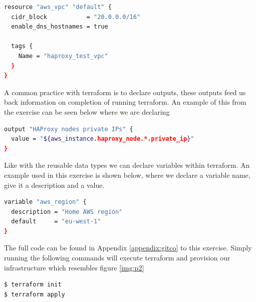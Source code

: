 \begin{lstlisting}[language=bash]
resource "aws_vpc" "default" {
  cidr_block           = "20.0.0.0/16"
  enable_dns_hostnames = true

  tags {
    Name = "haproxy_test_vpc"
  }
}
\end{lstlisting}

A common practice with terraform is to declare outputs, these outputs feed us back information on completion of running terraform. An example of this from the exercise can be seen below where we are declaring 

\begin{lstlisting}[language=bash]
output "HAProxy nodes private IPs" {
  value = "${aws_instance.haproxy_node.*.private_ip}"
}
\end{lstlisting}

Like with the reusable data types we can declare variables within terraform. An example used in this exercise is shown below, where we declare a variable name, give it a description and a value.
\clearpage
\begin{lstlisting}[language=bash]
variable "aws_region" {
  description = "Home AWS region"
  default     = "eu-west-1"
}
\end{lstlisting}

The full code can be found in Appendix \ref{appendix:gitco} to this exercise. Simply running the following commands will execute terraform and provision our infrastructure which resembles figure \ref{img:p2}

\begin{lstlisting}[language=bash]
$ terraform init
$ terraform apply
\end{lstlisting}

